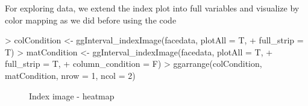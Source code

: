 \documentclass[article]{jss}
\begin{document}
For exploring data, we extend the index plot into full variables and visualize by color mapping as we did before using the code

\begin{Schunk}
\begin{Sinput}
> colCondition <- ggInterval_indexImage(facedata, plotAll = T,
+                       full_strip = T) 
> matCondition <- ggInterval_indexImage(facedata, plotAll = T,
+                       full_strip = T,
+                       column_condition = F)
> ggarrange(colCondition, matCondition, nrow = 1, ncol = 2)
\end{Sinput}
\end{Schunk}

\begin{figure}[htbp]
    \centering
    \caption{\label{fig:indexImage} Index image - heatmap}
\end{figure}
\end{document}
